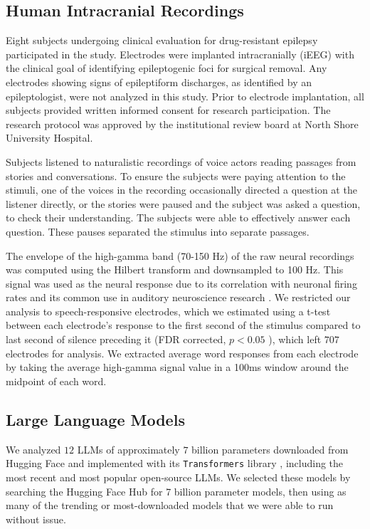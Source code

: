 \subsection{Human Intracranial Recordings}

Eight subjects undergoing clinical evaluation for drug-resistant epilepsy participated in the study. Electrodes were implanted intracranially (iEEG) with the clinical goal of identifying epileptogenic foci for surgical removal. Any electrodes showing signs of epileptiform discharges, as identified by an epileptologist, were not analyzed in this study. Prior to electrode implantation, all subjects provided written informed consent for research participation. The research protocol was approved by the institutional review board at North Shore University Hospital.

Subjects listened to naturalistic recordings of voice actors reading passages from stories and conversations. To ensure the subjects were paying attention to the stimuli, one of the voices in the recording occasionally directed a question at the listener directly, or the stories were paused and the subject was asked a question, to check their understanding. The subjects were able to effectively answer each question. These pauses separated the stimulus into separate passages.

The envelope of the high-gamma band (70-150 Hz) of the raw neural recordings was computed using the Hilbert transform \cite{edwards2009comparison} and downsampled to 100 Hz. This signal was used as the neural response due to its correlation with neuronal firing rates \cite{ray2011different, steinschneider2008spectrotemporal} and its common use in auditory neuroscience research \cite{mesgarani2014phonetic, bouchard2013functional}. We restricted our analysis to speech-responsive electrodes, which we estimated using a t-test between each electrode's response to the first second of the stimulus compared to last second of silence preceding it (FDR corrected, $p<0.05$ \cite{holm1979simple}), which left $707$ electrodes for analysis. We extracted average word responses from each electrode by taking the average high-gamma signal value in a 100ms window around the midpoint of each word.


\subsection{Large Language Models}

We analyzed $12$ LLMs of approximately $7$ billion parameters downloaded from Hugging Face and implemented with its \texttt{Transformers} library \cite{wolf2019huggingface}, including the most recent and most popular open-source LLMs. We selected these models by searching the Hugging Face Hub for 7 billion parameter models, then using as many of the trending or most-downloaded models that we were able to run without issue. 

